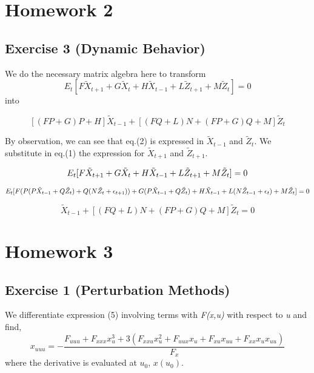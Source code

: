 \documentclass[12pt]{article}
\begin{document}
\section{Homework 2}
\subsection*{Exercise 3 (Dynamic Behavior)}

We do the necessary matrix algebra here to transform
\begin{equation}\label{uhlig}
E_t [F \tilde{X}_{t+1} + G  \tilde{X}_t + H  \tilde{X}_{t-1} + L  \tilde{Z}_{t+1} + M  \tilde{Z}_t]  = 0
\end{equation}
into 

\begin{equation}\label{uhlig}
[(FP + G)P + H] \tilde{X}_{t-1} + [(FQ + L)N + (FP + G)Q + M]\tilde{Z}_t
\end{equation}

By observation, we can see that eq.(2) is expressed in $\tilde{X}_{t-1}$ and $\tilde{Z}_{t}$. We substitute in eq.(1) the expression for $\tilde{X}_{t+1}$ and $\tilde{Z}_{t+1}$.

\begin{equation}
E_t [F \tilde{X}_{t+1} + G  \tilde{X}_t + H  \tilde{X}_{t-1} + L  \tilde{Z}_{t+1} + M  \tilde{Z}_t]=0  \\
\end{equation}

\begin{equation}
E_t [ F (P( P  \tilde{X}_{t-1} + Q  \tilde{Z}_t) + Q( N  \tilde{Z}_{t} + \epsilon_{t+1})) + G ( P  \tilde{X}_{t-1} + Q  \tilde{Z}_t) + H  \tilde{X}_{t-1} + L(N  \tilde{Z}_{t-1} + \epsilon_t) + M  \tilde{Z}_t \\]=0
\end{equation}

\begin{equation}
[(FP + G)P + H] \tilde{X}_{t-1} + [(FQ + L)N + (FP + G)Q + M]\tilde{Z}_t=0
\end{equation}

\section{Homework 3}
\subsection*{Exercise 1 (Perturbation Methods)}

We differentiate expression (5) involving terms with \textit{F(x,u)} with respect to \textit{u} and find,
\begin{equation}
x_{uuu} = -\frac{F_{uuu}+F_{xxx}x^3_u + 3(F_{xxu}x^2_u + F_{uux}x_u + F_{xu}x_{uu} + F_{xx}x_ux_{uu}) }{F_x}
\end{equation}
where the derivative is evaluated at  $u_0$, $x(u_0)$.
\end{document}
